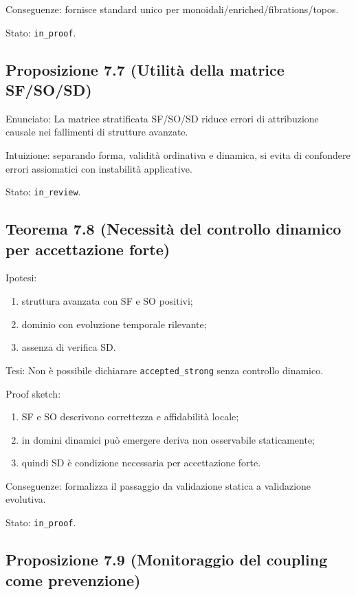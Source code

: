 Conseguenze:
fornisce standard unico per monoidali/enriched/fibrations/topos.

Stato: \texttt{in\_proof}.

\subsection{Proposizione 7.7 (Utilità della matrice SF/SO/SD)}

Enunciato:
La matrice stratificata SF/SO/SD riduce errori di attribuzione causale nei fallimenti di strutture avanzate.

Intuizione:
separando forma, validità ordinativa e dinamica, si evita di confondere errori assiomatici con instabilità applicative.

Stato: \texttt{in\_review}.

\subsection{Teorema 7.8 (Necessità del controllo dinamico per accettazione forte)}

Ipotesi:

\begin{enumerate}
\def\labelenumi{\arabic{enumi}.}
\tightlist
\item
  struttura avanzata con SF e SO positivi;
\item
  dominio con evoluzione temporale rilevante;
\item
  assenza di verifica SD.
\end{enumerate}

Tesi:
Non è possibile dichiarare \texttt{accepted\_strong} senza controllo dinamico.

Proof sketch:

\begin{enumerate}
\def\labelenumi{\arabic{enumi}.}
\tightlist
\item
  SF e SO descrivono correttezza e affidabilità locale;
\item
  in domini dinamici può emergere deriva non osservabile staticamente;
\item
  quindi SD è condizione necessaria per accettazione forte.
\end{enumerate}

Conseguenze:
formalizza il passaggio da validazione statica a validazione evolutiva.

Stato: \texttt{in\_proof}.

\subsection{Proposizione 7.9 (Monitoraggio del coupling come prevenzione)}

